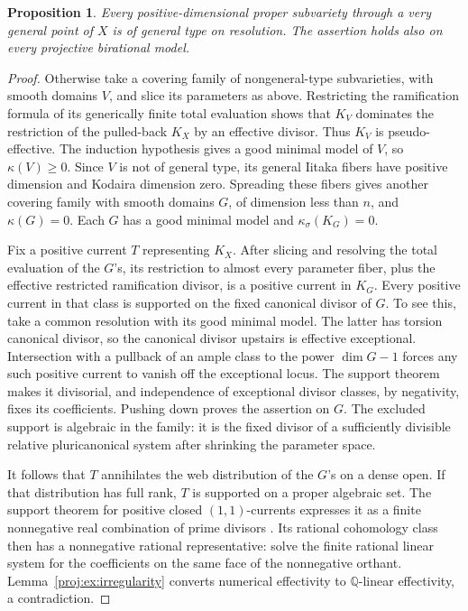 \documentclass[11pt,letterpaper]{article}
\newtheorem{proposition}[theorem]{Proposition}
\theoremstyle{definition}
\theoremstyle{remark}
\begin{document}
\begin{proposition}\label{proj:prop:general-type}
Every positive-dimensional proper subvariety through a very general
point of \(X\) is of general type on resolution. The assertion holds
also on every projective birational model.
\end{proposition}
\begin{proof}
Otherwise take a covering family of nongeneral-type subvarieties,
with smooth domains \(V\), and slice its parameters as above.
Restricting the ramification formula of its generically finite
total evaluation shows that \(K_V\) dominates the restriction of
the pulled-back \(K_X\) by an effective divisor. Thus \(K_V\) is
pseudo-effective. The induction hypothesis gives a good minimal
model of \(V\), so \(\kappa(V)\geq0\). Since \(V\) is not of general
type, its general Iitaka fibers have positive dimension and
Kodaira dimension zero. Spreading these fibers gives another
covering family with smooth domains \(G\), of dimension less than
\(n\), and \(\kappa(G)=0\). Each \(G\) has a good minimal model and
\(\kappa_\sigma(K_G)=0\).

Fix a positive current \(T\) representing \(K_X\). After slicing and
resolving the total evaluation of the \(G\)'s, its restriction to
almost every parameter fiber, plus the effective restricted
ramification divisor, is a positive current in \(K_G\).
Every positive current in that class is supported on the fixed
canonical divisor of \(G\). To see this, take a common resolution
with its good minimal model. The latter has torsion canonical
divisor, so the canonical divisor upstairs is effective exceptional.
Intersection with a pullback of an ample class to the power
\(\dim G-1\) forces any such positive current to vanish off the
exceptional locus. The support theorem makes it divisorial, and
independence of exceptional divisor classes, by negativity, fixes
its coefficients. Pushing down proves the assertion on \(G\).
The excluded support is algebraic in the family: it is the fixed
divisor of a sufficiently divisible relative pluricanonical
system after shrinking the parameter space.

It follows that \(T\) annihilates the web distribution of the
\(G\)'s on a dense open. If that distribution has full rank, \(T\)
is supported on a proper algebraic set. The support theorem for
positive closed \((1,1)\)-currents expresses it as a finite
nonnegative real combination of prime divisors
\cite{Proj-Siu1974,Proj-Demailly2012}. Its rational cohomology class then has
a nonnegative rational representative: solve the finite rational
linear system for the coefficients on the same face of the
nonnegative orthant. Lemma~\ref{proj:ex:irregularity} converts numerical
effectivity to \(\mathbb{Q}\)-linear effectivity, a contradiction.


\end{proof}
\end{document}
